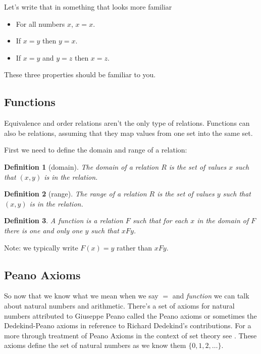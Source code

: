 \documentclass[oneside]{book}
\newtheorem{definition}{Definition}
\newcommand{\set}[1]{\{#1\}}
\begin{document}
\begin{spacing}{1.618}
Let's write that in something that looks more familiar
\begin{itemize}
	\item For all numbers $x$, $x=x$. 
	\item If $x=y$ then $y=x$.
	\item If $x=y$ and $y=z$ then $x=z$. 
\end{itemize}

These three properties should be familiar to you. 

\subsection{Functions}

Equivalence and order relations aren't the only type of relations. Functions can also be relations, assuming that they map values from one set into the same set. 

First we need to define the domain and range of a relation: 

\begin{definition}[domain]
	The domain of a relation $R$ is the set of values $x$ such that $(x, y)$ is in the relation. 
\end{definition}

\begin{definition}[range]
	The range of a relation $R$ is the set of values $y$ such that $(x, y)$ is in the relation. 
\end{definition}


\begin{definition}
	A function is a relation $F$ such that for each $x$ in the domain of $F$ there is one and only one $y$ such that $xFy$. 
\end{definition}

Note: we typically write $F(x)=y$ rather than $xFy$. 

\subsection{Peano Axioms}
So now that we know what we mean when we say $=$ and \emph{function} we can talk about natural numbers and arithmetic. There's a set of axioms for natural numbers attributed to Giuseppe Peano called the Peano axioms or sometimes the Dedekind-Peano axioms in reference to Richard Dedekind's contributions. For a more through treatment of Peano Axioms in the context of set theory see \cite{suppes72}. These axioms define the set of natural numbers as we know them $\set{0, 1, 2, \dots}$. 


\end{spacing}
\end{document}
